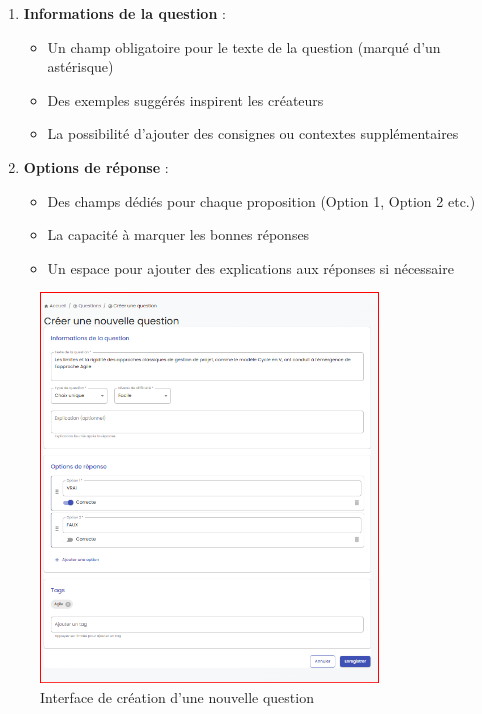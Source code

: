 \documentclass[12pt,a4paper]{report}
\begin{document}
\begin{enumerate}
\item \textbf{Informations de la question} :
   \begin{itemize}
   \item Un champ obligatoire pour le texte de la question (marqué d'un astérisque)
   \item Des exemples suggérés inspirent les créateurs
   \item La possibilité d'ajouter des consignes ou contextes supplémentaires
   \end{itemize}

\item \textbf{Options de réponse} :
   \begin{itemize}
   \item Des champs dédiés pour chaque proposition (Option 1, Option 2 etc.)
   \item La capacité à marquer les bonnes réponses
   \item Un espace pour ajouter des explications aux réponses si nécessaire
   \end{itemize}
\end{enumerate}

\begin{figure}[H]
\centering
\includegraphics[width=0.8\textwidth]{latex_media/media/image55.png}
\caption{Interface de création d'une nouvelle question}
\label{fig:creation-question}
\end{figure}
\end{document}
